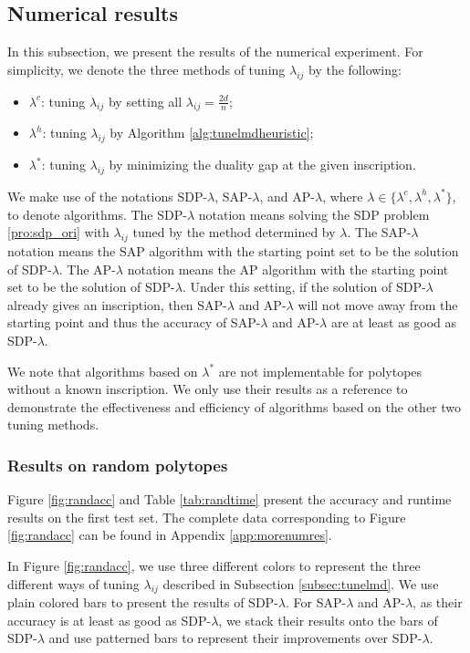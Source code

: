 \documentclass[smallextended, envcountsame]{svjour3}
\begin{document}
\subsection{Numerical results}\label{subsec:numres}
    In this subsection, we present the results of the numerical experiment.  For simplicity, we denote the three methods of tuning $\lambda_{ij}$ by the following:
    \begin{itemize}
        \item $\lambda^c$: tuning $\lambda_{ij}$ by setting all $\lambda_{ij}=\frac{2d}{n}$;
        \item $\lambda^h$: tuning $\lambda_{ij}$ by Algorithm \ref{alg:tunelmdheuristic};
        \item $\lambda^*$: tuning $\lambda_{ij}$ by minimizing the duality gap at the given inscription.
    \end{itemize}
    We make use of the notations SDP-$\lambda$, SAP-$\lambda$, and AP-$\lambda$, where $\lambda\in\{\lambda^c,\lambda^h,\lambda^*\}$, to denote algorithms.  The SDP-$\lambda$ notation means solving the SDP problem \eqref{pro:sdp_ori} with $\lambda_{ij}$ tuned by the method determined by $\lambda$.  The SAP-$\lambda$ notation means the SAP algorithm with the starting point set to be the solution of SDP-$\lambda$.  The AP-$\lambda$ notation means the AP algorithm with the starting point set to be the solution of SDP-$\lambda$.  Under this setting, if the solution of SDP-$\lambda$ already gives an inscription, then SAP-$\lambda$ and AP-$\lambda$ will not move away from the starting point and thus the accuracy of SAP-$\lambda$ and AP-$\lambda$ are at least as good as SDP-$\lambda$.

    We note that algorithms based on $\lambda^*$ are not implementable for polytopes without a known inscription.  We only use their results as a reference to demonstrate the effectiveness and efficiency of algorithms based on the other two tuning methods. 

\subsubsection{Results on random polytopes}
    Figure \ref{fig:randacc} and Table \ref{tab:randtime} present the accuracy and runtime results on the first test set.  The complete data corresponding to Figure \ref{fig:randacc} can be found in Appendix \ref{app:morenumres}.

    In Figure \ref{fig:randacc}, we use three different colors to represent the three different ways of tuning $\lambda_{ij}$ described in Subsection \ref{subsec:tunelmd}.  We use plain colored bars to present the results of SDP-$\lambda$.  For SAP-$\lambda$ and AP-$\lambda$, as their accuracy is at least as good as SDP-$\lambda$, we stack their results onto the bars of SDP-$\lambda$ and use patterned bars to represent their improvements over SDP-$\lambda$.
    
\end{document}
